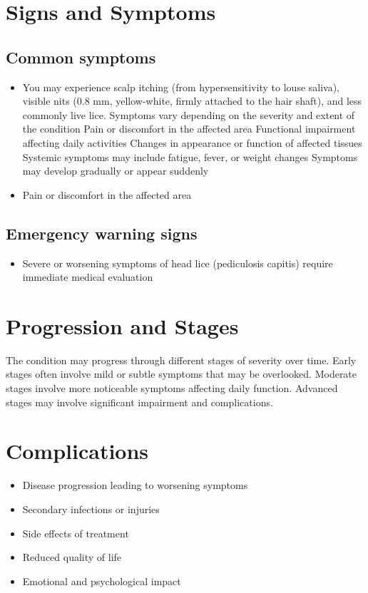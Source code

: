 \section{Signs and Symptoms}

\subsection{Common symptoms}
\begin{itemize}[noitemsep]
  \item You may experience scalp itching (from hypersensitivity to louse saliva), visible nits (0.8 mm, yellow-white, firmly attached to the hair shaft), and less commonly live lice. Symptoms vary depending on the severity and extent of the condition Pain or discomfort in the affected area Functional impairment affecting daily activities Changes in appearance or function of affected tissues Systemic symptoms may include fatigue, fever, or weight changes Symptoms may develop gradually or appear suddenly
  \item Pain or discomfort in the affected area
  \end{itemize}

\subsection{Emergency warning signs}
\begin{itemize}[noitemsep]
  \item Severe or worsening symptoms of head lice (pediculosis capitis) require immediate medical evaluation
\end{itemize}
\section{Progression and Stages}
The condition may progress through different stages of severity over time. Early stages often involve mild or subtle symptoms that may be overlooked. Moderate stages involve more noticeable symptoms affecting daily function. Advanced stages may involve significant impairment and complications.
\section{Complications}
\begin{itemize}[noitemsep]
  \item Disease progression leading to worsening symptoms
  \item Secondary infections or injuries
  \item Side effects of treatment
  \item Reduced quality of life
  \item Emotional and psychological impact
\end{itemize}
